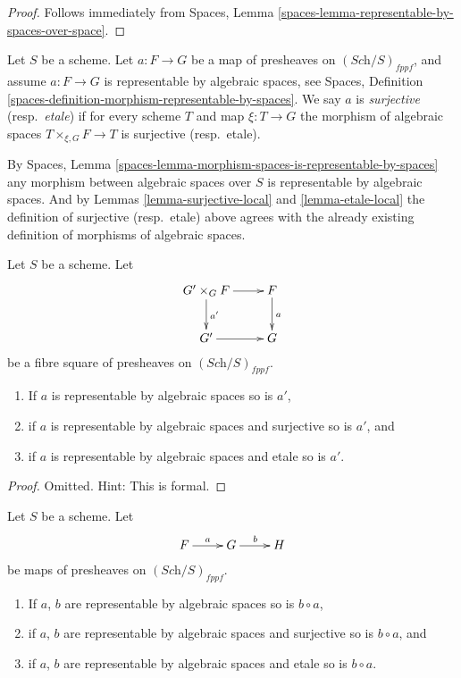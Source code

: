 \begin{proof}
Follows immediately from
Spaces, Lemma \ref{spaces-lemma-representable-by-spaces-over-space}.
\end{proof}

\begin{definition}
\label{definition-surjective-transformation}
Let $S$ be a scheme.
Let $a : F \to G$ be a map of presheaves on $(\textit{Sch}/S)_{fppf}$, and
assume $a : F \to G$ is representable by algebraic spaces, see
Spaces, Definition \ref{spaces-definition-morphism-representable-by-spaces}.
We say $a$ is {\it surjective} (resp.\ {\it etale})
if for every scheme $T$ and map $\xi : T \to G$
the morphism of algebraic spaces $T \times_{\xi, G} F \to T$
is surjective (resp.\ etale).
\end{definition}

\noindent
By
Spaces, Lemma \ref{spaces-lemma-morphism-spaces-is-representable-by-spaces}
any morphism between algebraic spaces over $S$ is representable by algebraic
spaces. And by
Lemmas \ref{lemma-surjective-local}
and \ref{lemma-etale-local}
the definition of surjective (resp.\ etale)
above agrees with the already existing definition of morphisms
of algebraic spaces.

\begin{lemma}
\label{lemma-base-change-transformation}
Let $S$ be a scheme.
Let
$$
\xymatrix{
G' \times_G F \ar[r] \ar[d]^{a'} & F \ar[d]^a \\
G' \ar[r] & G
}
$$
be a fibre square of presheaves on $(\textit{Sch}/S)_{fppf}$.
\begin{enumerate}
\item If $a$ is representable by algebraic spaces so is $a'$,
\item if $a$ is representable by algebraic spaces and surjective so is $a'$,
and
\item if $a$ is representable by algebraic spaces and etale so is $a'$.
\end{enumerate}
\end{lemma}

\begin{proof}
Omitted. Hint: This is formal.
\end{proof}

\begin{lemma}
\label{lemma-composition-transformation}
Let $S$ be a scheme.
Let
$$
\xymatrix{
F \ar[r]^a & G \ar[r]^b & H
}
$$
be maps of presheaves on $(\textit{Sch}/S)_{fppf}$.
\begin{enumerate}
\item If $a$, $b$ are representable by algebraic spaces so is $b \circ a$,
\item if $a$, $b$ are representable by algebraic spaces and surjective
so is $b \circ a$, and
\item if $a$, $b$ are representable by algebraic spaces and etale so is
$b \circ a$.
\end{enumerate}
\end{lemma}

